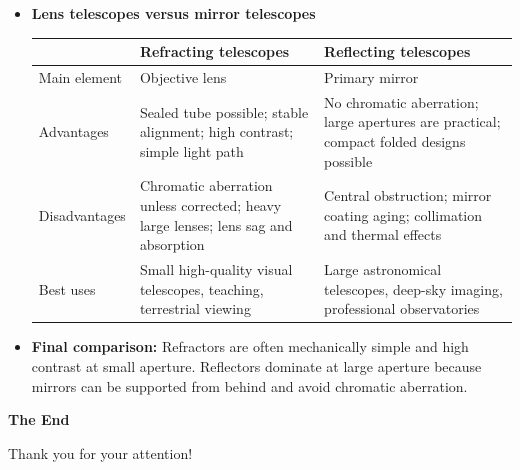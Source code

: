 \documentclass[t,aspectratio=169]{beamer}
\begin{document}
\begin{frame}
\begin{itemize}
\pagebreak
\item \textbf{Lens telescopes versus mirror telescopes}
\begin{tabular}{p{}p{}p{}}
\toprule
 & Refracting telescopes & Reflecting telescopes \\
\midrule
Main element & Objective lens & Primary mirror \\
Advantages & Sealed tube possible; stable alignment; high contrast; simple light path & No chromatic aberration; large apertures are practical; compact folded designs possible \\
Disadvantages & Chromatic aberration unless corrected; heavy large lenses; lens sag and absorption & Central obstruction; mirror coating aging; collimation and thermal effects \\
Best uses & Small high-quality visual telescopes, teaching, terrestrial viewing & Large astronomical telescopes, deep-sky imaging, professional observatories \\
\bottomrule
\end{tabular}
\pagebreak
\item \textbf{Final comparison:} Refractors are often mechanically simple and high contrast at small aperture. Reflectors dominate at large aperture because mirrors can be supported from behind and avoid chromatic aberration.

\end{itemize}
\end{frame}


\begin{frame}

\vfill
\begin{center}
\textbf{\huge The End}

\bigskip
Thank you for your attention!
\end{center}
\vfill
\end{frame}
\end{document}
